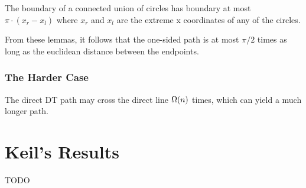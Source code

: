 \documentclass{tufte-handout}
\begin{document}
\begin{Lemma}

  The boundary of a connected union of circles has boundary at most
  $\pi \cdot (x_r - x_l)$ where $x_r$ and $x_l$ are the extreme x
  coordinates of any of the circles.
  
\end{Lemma}

From these lemmas, it follows that the one-sided path is at most
$\pi/2$ times as long as the euclidean distance between the endpoints.

\section{The Harder Case}

The direct DT path may cross the direct line $\Omega\!\left(n\right)$ times,
which can yield a much longer path.



\part{Keil's Results}

TODO


\newpage

\end{document}
